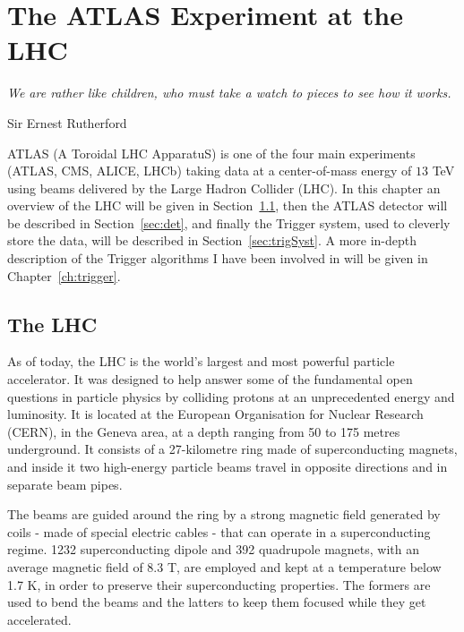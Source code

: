\chapter{The ATLAS Experiment at the LHC}
\label{ch:detector}
\epigraph{\emph{We are rather like children, who must take a watch to pieces to see how it works.}}{Sir Ernest Rutherford}

	ATLAS (A Toroidal LHC ApparatuS) is one of the four main experiments (ATLAS, CMS, ALICE, LHCb) taking data at a center-of-mass energy of $13$ TeV using beams delivered by the Large Hadron Collider (LHC). In this chapter an overview of the LHC will be given in Section~\ref{sec:lhc}, then the ATLAS detector will be described in Section~\ref{sec:det}, and finally the Trigger system, used to cleverly store the data, will be described in Section~\ref{sec:trigSyst}. A more in-depth description of the Trigger algorithms I have been involved in will be given in Chapter~\ref{ch:trigger}.



	\section{The LHC}
	\label{sec:lhc}
	
		As of today, the LHC is the world’s largest and most powerful particle accelerator. It was designed to help answer some of the fundamental open questions in particle physics by colliding protons at an unprecedented energy and luminosity. It is located at the European Organisation for Nuclear Research (CERN), in the Geneva area, at a depth ranging from 50 to 175 metres underground. It consists of a 27-kilometre ring made of superconducting magnets, and inside it two high-energy particle beams travel in opposite directions and in separate beam pipes. 

		The beams are guided around the ring by a strong magnetic field generated by coils - made of special electric cables - that can operate in a superconducting regime.%
		1232 superconducting dipole and 392 quadrupole magnets, with an average magnetic field of 8.3 T, are employed and kept at a temperature below 1.7 K, in order to preserve their superconducting properties. The formers are used to bend the beams and the latters to keep them focused while they get accelerated. 
		
